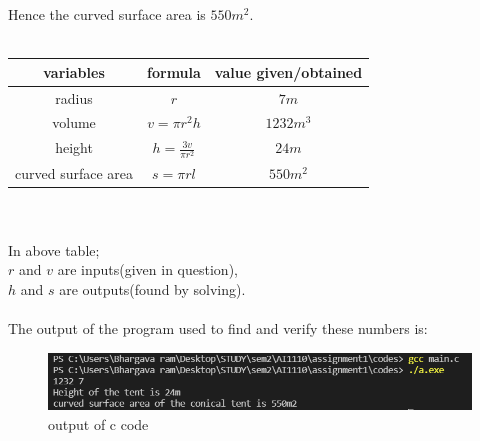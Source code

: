 \documentclass[article,12pt,twocolumn]{IEEEtran}
\begin{document}
  Hence the curved surface area is $ 550 m^2 $. \\\\
  \begin{tabular}{|c|c|c|}
    \hline
     variables & formula & value given/obtained \\
    \hline \hline
    radius & $r$ & $7m$ \\
    \hline
    volume & $v = \pi r^2 h$ & $1232 m^3$ \\
    \hline
    height & $h = \frac{3 v}{\pi r^2}$ & $24m$ \\
    \hline
    curved surface area & $s = \pi r l$ & $550 m^2$ \\
    \hline
 \end{tabular} \\\\  
  In above table;\\
  $r$ and $v$ are inputs(given in question),\\
  $h$ and $s$ are outputs(found by solving).\\\\
  The output of the program used to find and verify these numbers
  is: \\
  \begin{figure}[h]
  \centering 
  \includegraphics[scale = 0.6]{output.png}
  \caption{output of c code}
  \end{figure}  
\end{document}
